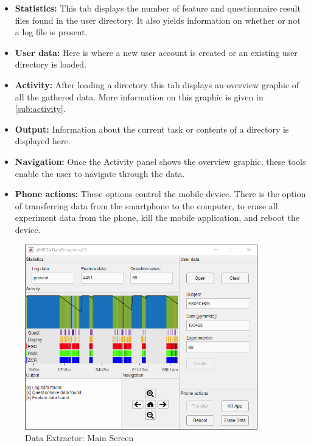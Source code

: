 \documentclass[11pt,a4paper,titlepage]{article}
\newcommand\ClrSquare[1]{\textcolor{#1}{\rule{7pt}{7pt}}}
\begin{document}
\begin{itemize}[label=\ClrSquare{jadeRed}]
	\item \textbf{Statistics:} This tab displays the number of feature and questionnaire result files found in the user directory. It also yields information on whether or not a log file is present.
	\item \textbf{User data:} Here is where a new user account is created or an existing user directory is loaded.
	\item \textbf{Activity:} After loading a directory this tab displays an overview graphic of all the gathered data. More information on this graphic is given in \ref{sub:activity}.
	\item \textbf{Output:} Information about the current task or contents of a directory is displayed here.
	\item \textbf{Navigation:} Once the Activity panel shows the overview graphic, these tools enable the user to navigate through the data.
	\item \textbf{Phone actions:} These options control the mobile device. There is the option of transferring data from the smartphone to the computer, to erase all experiment data from the phone, kill the mobile application, and reboot the device.
\end{itemize}

\begin{figure}[h]
	\centering
		\includegraphics[width=0.90\textwidth]{images/DataExtractor.png}
	\caption{Data Extractor: Main Screen}
	\label{fig:DataExtractor}
\end{figure}
\end{document}
